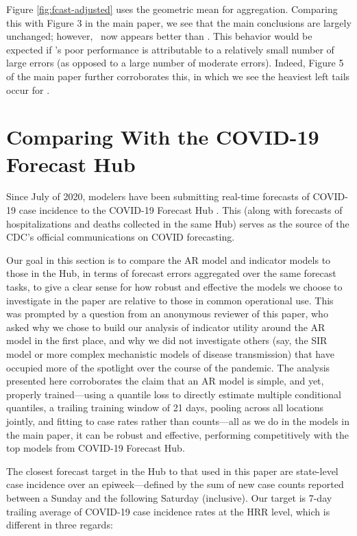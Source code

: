 Figure \ref{fig:fcast-adjusted} uses the geometric mean for aggregation.
Comparing this with Figure 3 in the main paper, we see that the main conclusions
are largely unchanged; however, \chngcli~now appears better than \ar.  This
behavior would be expected if \chngcli's poor performance is attributable to a
relatively small number of large errors (as opposed to a large number of
moderate errors).  Indeed, Figure 5 of the main paper further corroborates this,
in which we see the heaviest left tails occur for \chngcli.

\section{Comparing With the COVID-19 Forecast Hub}

Since July of 2020, modelers have been submitting real-time forecasts of
COVID-19 case incidence to the COVID-19 Forecast Hub \cite{ForecastHub}. This 
(along with forecasts of hospitalizations and deaths collected in the same Hub)
serves as the source of the CDC's official communications on COVID forecasting. 

Our goal in this section is to compare the AR model and indicator models to
those in the Hub, in terms of forecast errors aggregated over the same forecast
tasks, to give a clear sense for how robust and effective the models we choose
to investigate in the paper are relative to those in common operational use.
This was prompted by a question from an anonymous reviewer of this paper, who
asked why we chose to build our analysis of indicator utility around the AR
model in the first place, and why we did not investigate others (say, the SIR
model or more complex mechanistic models of disease transmission) that have
occupied more of the spotlight over the course of the pandemic.  The analysis
presented here corroborates the claim that an AR model is simple, and yet,
properly trained---using a quantile loss to directly estimate multiple
conditional quantiles, a trailing training window of 21 days, pooling across all
locations jointly, and fitting to case rates rather than counts---all as we do
in the models in the main paper, it can be robust and effective, performing 
competitively with the top models from COVID-19 Forecast Hub.

The closest forecast target in the Hub to that used in this paper are
state-level case incidence over an epiweek---defined by the sum of new case
counts reported between a Sunday and the following Saturday (inclusive). Our
target is 7-day trailing average of COVID-19 case incidence rates at the HRR
level, which is different in three regards:

